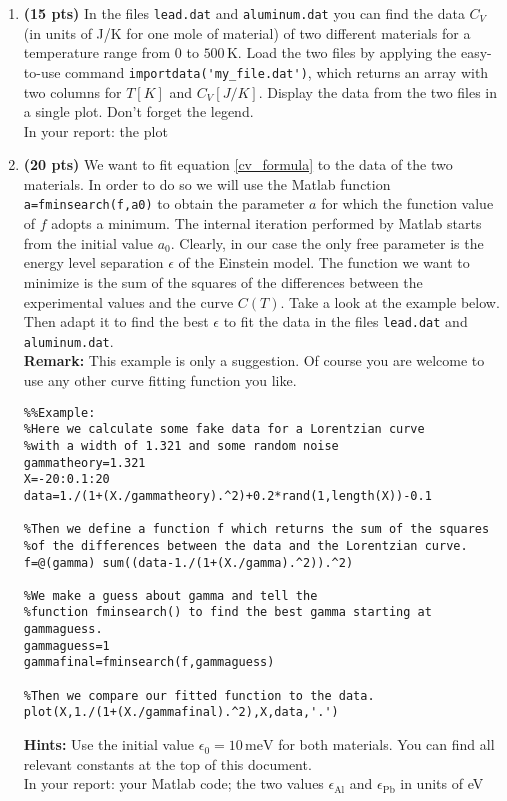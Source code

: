 \documentclass[11pt]{article}
\begin{document}
\begin{enumerate}[resume]

\item \textbf{(15 pts)} In the files \verb|lead.dat| and \verb|aluminum.dat| you can find the data $C_V$ (in units of J/K for one mole of material) of two different materials for a temperature range from 0 to $500\,\mathrm{K}$. Load the two files by applying the easy-to-use command \verb|importdata('my_file.dat')|, which returns an array with two columns for $T[K]$ and $C_V[J/K]$. Display the data from the two files in a single plot. Don't forget the legend.\\
In your report: the plot

\item \textbf{(20 pts)} \label{fit_problem}We want to fit equation \ref{cv_formula} to the data of the two materials. In order to do so we will use the Matlab function \verb|a=fminsearch(f,a0)| to obtain the parameter $a$ for which the function value of $f$ adopts a minimum. The internal iteration performed by Matlab starts from the initial value $a_0$. Clearly, in our case the only free parameter is the energy level separation $\epsilon$ of the Einstein model. The function we want to minimize is the sum of the squares of the differences between the experimental values and the curve $C(T)$. Take a look at the example below. Then adapt it to find the best $\epsilon$ to fit the data in the files \verb|lead.dat| and \verb|aluminum.dat|.\\
\textbf{Remark:} This example is only a suggestion. Of course you are welcome to use any other curve fitting function you like.
\begin{verbatim}
%%Example:
%Here we calculate some fake data for a Lorentzian curve 
%with a width of 1.321 and some random noise
gammatheory=1.321
X=-20:0.1:20
data=1./(1+(X./gammatheory).^2)+0.2*rand(1,length(X))-0.1

%Then we define a function f which returns the sum of the squares
%of the differences between the data and the Lorentzian curve.
f=@(gamma) sum((data-1./(1+(X./gamma).^2)).^2)

%We make a guess about gamma and tell the
%function fminsearch() to find the best gamma starting at gammaguess.
gammaguess=1
gammafinal=fminsearch(f,gammaguess)

%Then we compare our fitted function to the data.
plot(X,1./(1+(X./gammafinal).^2),X,data,'.')
\end{verbatim}

\textbf{Hints:} Use the initial value $\epsilon_0=10\,\mathrm{meV}$ for both materials. You can find all relevant constants at the top of this document.\\ 
In your report: your Matlab code; the two values $\epsilon_\mathrm{Al}$ and $\epsilon_\mathrm{Pb}$ in units of eV


\end{enumerate}
\end{document}

